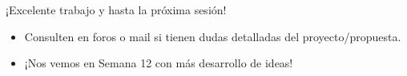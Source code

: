 \documentclass[10pt]{beamer}
\begin{document}
\begin{frame}
  \Huge{\centerline{¡Excelente trabajo y hasta la próxima sesión!}}
  \vspace{0.5cm}
  \normalsize
  \begin{itemize}
    \item Consulten en foros o mail si tienen dudas detalladas del proyecto/propuesta.
    \item ¡Nos vemos en Semana 12 con más desarrollo de ideas!
  \end{itemize}
\end{frame}
\end{document}
